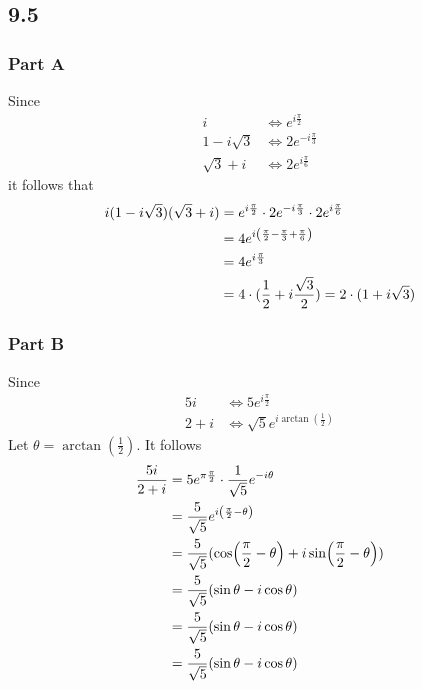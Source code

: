\documentclass[12pt,titlepage]{extarticle}
\begin{document}
\subsection*{9.5}
\subsubsection*{Part A}
Since
\begin{align*}
    i &\Leftrightarrow e^{i\frac{\pi}{2}} \\
    1 - i\sqrt{3} &\Leftrightarrow 2e^{-i \frac{\pi}{3}} \\
    \sqrt{3} + i &\Leftrightarrow 2e^{i \frac{\pi}{6}}
\end{align*}
it follows that
\begin{align*}
    i (1 - i\sqrt{3})(\sqrt{3} + i) &= e^{i \frac{\pi}{2}} \cdot 2 e^{-i \frac{\pi}{3}} \cdot 2e^{i \frac{\pi}{6}} \\
    &= 4 e^{i\qty(\frac{\pi}{2} - \frac{\pi}{3} + \frac{\pi}{6})} \\
    &= 4e^{i \frac{\pi}{3}} \\
    &= 4 \cdot (\frac{1}{2} + i\frac{\sqrt{3}}{2}) = 2 \cdot (1 + i\sqrt{3})
\end{align*}

\subsubsection*{Part B}
Since
\begin{align*}
    5i &\Leftrightarrow 5 e^{i \frac{\pi}{2}} \\
    2 + i &\Leftrightarrow \sqrt{5} e^{i \arctan(\frac{1}{2})}
\end{align*}
Let $\theta = \arctan(\frac{1}{2})$. It follows
\begin{align*}
    \frac{5i}{2+i} &= 5e^{\pi \frac{\pi}{2}} \cdot \frac{1}{\sqrt{5}} e^{-i \theta} \\
                   &= \frac{5}{\sqrt{5}} e^{i \qty(\frac{\pi}{2} - \theta)} \\
                   &= \frac{5}{\sqrt{5}} (\cos(\frac{\pi}{2} - \theta) + i \sin(\frac{\pi}{2} - \theta)) \\
                   &= \frac{5}{\sqrt{5}} (\sin \theta - i \cos \theta) \\
                   &= \frac{5}{\sqrt{5}} (\sin \theta - i \cos \theta) \\
                   &= \frac{5}{\sqrt{5}} (\sin \theta - i \cos \theta) \\
\end{align*}
\end{document}
